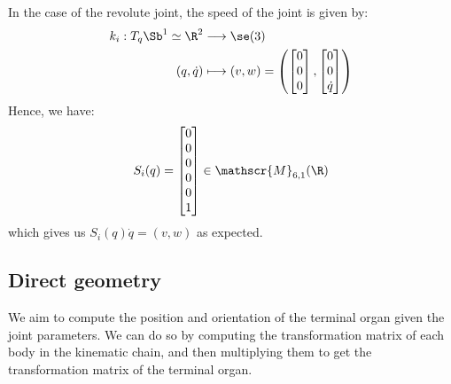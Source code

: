 In the case of the revolute joint, the speed of the joint is given by:
\begin{equation*}
    \begin{aligned}
        k_i: T_q\Sb^1\simeq\R^2 &\longrightarrow \se(3)\\
        (q, \dot{q}) &\longmapsto (v, w) = \left(
            \begin{bmatrix}
                0\\0\\0
            \end{bmatrix}, \begin{bmatrix}
                0\\0\\\dot{q}
            \end{bmatrix}\right)
    \end{aligned}
\end{equation*}
Hence, we have:
\begin{equation*}
    S_i(q) = \begin{bmatrix}
        0\\0\\0\\0\\0\\1
    \end{bmatrix} \in \mathscr{M}_{6, 1}(\R)
\end{equation*}
which gives us $S_i(q)\dot{q}=(v,w)$ as expected.

\subsection{Direct geometry}
We aim to compute the position and orientation of the terminal organ given the joint parameters. We can do so by computing the transformation matrix of each body in the kinematic chain, and then multiplying them to get the transformation matrix of the terminal organ.

